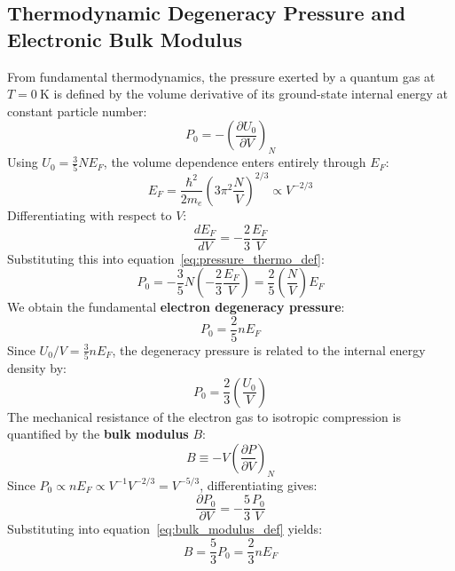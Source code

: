 \documentclass[11pt,a4paper]{article}
\begin{document}
\subsection{Thermodynamic Degeneracy Pressure and Electronic Bulk Modulus}
From fundamental thermodynamics, the pressure exerted by a quantum gas at $T = 0\ \mathrm{K}$ is defined by the volume derivative of its ground-state internal energy at constant particle number:
\begin{equation}
P_0 = -\left(\frac{\partial U_0}{\partial V}\right)_N
\label{eq:pressure_thermo_def}
\end{equation}
Using $U_0 = \frac{3}{5}N E_F$, the volume dependence enters entirely through $E_F$:
\begin{equation}
E_F = \frac{\hbar^2}{2m_e}\left(3\pi^2 \frac{N}{V}\right)^{2/3} \propto V^{-2/3}
\end{equation}
Differentiating with respect to $V$:
\begin{equation}
\frac{dE_F}{dV} = -\frac{2}{3}\frac{E_F}{V}
\end{equation}
Substituting this into equation~\eqref{eq:pressure_thermo_def}:
\begin{equation}
P_0 = -\frac{3}{5}N \left(-\frac{2}{3}\frac{E_F}{V}\right) = \frac{2}{5}\left(\frac{N}{V}\right)E_F
\end{equation}
We obtain the fundamental \textbf{electron degeneracy pressure}:
\begin{equation}
\boxed{P_0 = \frac{2}{5}n E_F}
\label{eq:fermi_pressure}
\end{equation}
Since $U_0/V = \frac{3}{5}n E_F$, the degeneracy pressure is related to the internal energy density by:
\begin{equation}
P_0 = \frac{2}{3}\left(\frac{U_0}{V}\right)
\label{eq:pressure_energy_relation}
\end{equation}
The mechanical resistance of the electron gas to isotropic compression is quantified by the \textbf{bulk modulus} $B$:
\begin{equation}
B \equiv -V\left(\frac{\partial P}{\partial V}\right)_N
\label{eq:bulk_modulus_def}
\end{equation}
Since $P_0 \propto n E_F \propto V^{-1} V^{-2/3} = V^{-5/3}$, differentiating gives:
\begin{equation}
\frac{\partial P_0}{\partial V} = -\frac{5}{3}\frac{P_0}{V}
\end{equation}
Substituting into equation~\eqref{eq:bulk_modulus_def} yields:
\begin{equation}
\boxed{B = \frac{5}{3}P_0 = \frac{2}{3}n E_F}
\label{eq:bulk_modulus}
\end{equation}
\end{document}
